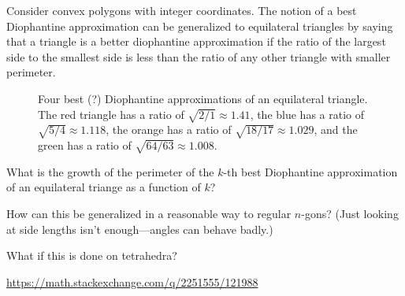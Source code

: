 \documentclass{article}
\begin{document}
  Consider convex polygons with integer coordinates. The notion of a best
  Diophantine approximation can be generalized to equilateral triangles by
  saying that a triangle is a better diophantine approximation if
  the ratio of the largest side to the smallest side is less than the ratio of
  any other triangle with smaller perimeter.
  \begin{figure}[ht!]
    \centering
    \caption{
      Four best (?) Diophantine approximations of an equilateral triangle.
      The red triangle has a ratio of $\sqrt{2/1} \approx 1.41$,
      the blue has a ratio of $\sqrt{5/4} \approx 1.118$,
      the orange has a ratio of $\sqrt{18/17} \approx 1.029$, and
      the green has a ratio of $\sqrt{64/63} \approx 1.008$.
    }
  \end{figure}
  \begin{question}
    What is the growth of the perimeter of the $k$-th best Diophantine
    approximation of an equilateral triange as a function of $k$?
  \end{question}

  \begin{related}
    \item How can this be generalized in a reasonable way to regular $n$-gons?
      (Just looking at side lengths isn't enough---angles can behave badly.)
    \item What if this is done on tetrahedra?
  \end{related}
  \begin{references}
    \item \url{https://math.stackexchange.com/q/2251555/121988}
  \end{references}
\end{document}
